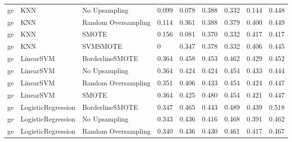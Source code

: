 \begin{tabular}{lllllllll}
      ge &                          KNN &       No Upsampling & 0.099 &                     0.078 &                 0.388 &                  0.332 &                                   0.144 &     0.448 \\
      ge &                          KNN & Random Oversampling & 0.114 &                     0.361 &                 0.388 &                  0.379 &                                   0.400 &     0.449 \\
      ge &                          KNN &               SMOTE & 0.156 &                     0.081 &                 0.370 &                  0.332 &                                   0.417 &     0.417 \\
      ge &                          KNN &            SVMSMOTE &     0 &                     0.347 &                 0.378 &                  0.332 &                                   0.406 &     0.445 \\
      ge &                    LinearSVM &     BorderlineSMOTE & 0.364 &                     0.458 &                 0.453 &                  0.462 &                                   0.429 &     0.452 \\
      ge &                    LinearSVM &       No Upsampling & 0.364 &                     0.424 &                 0.424 &                  0.454 &                                   0.433 &     0.444 \\
      ge &                    LinearSVM & Random Oversampling & 0.351 &                     0.406 &                 0.433 &                  0.454 &                                   0.424 &     0.447 \\
      ge &                    LinearSVM &               SMOTE & 0.364 &                     0.425 &                 0.480 &                  0.454 &                                   0.421 &     0.447 \\
      ge &           LogisticRegression &     BorderlineSMOTE & 0.347 &                     0.465 &                 0.443 &                  0.489 &                                   0.439 &     0.518 \\
      ge &           LogisticRegression &       No Upsampling & 0.343 &                     0.436 &                 0.416 &                  0.468 &                                   0.391 &     0.462 \\
      ge &           LogisticRegression & Random Oversampling & 0.340 &                     0.436 &                 0.430 &                  0.461 &                                   0.417 &     0.467 \\

\end{tabular}
